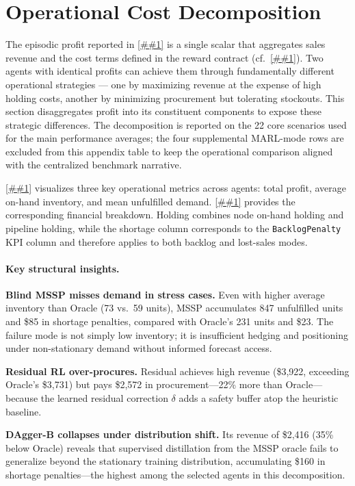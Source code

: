 \documentclass[10pt,a4paper]{article}
\providecommand{\Cref}[1]{\ref{##1}}
\let\origenumerate\enumerate
\let\endorigenumerate\endenumerate
\renewenvironment{enumerate}[1][]{\origenumerate}{\endorigenumerate}
\begin{document}
\section{Operational Cost Decomposition}\label{sec:appendix_decomposition}

The episodic profit reported in \Cref{sec:results} is a single scalar
that aggregates sales revenue and the cost terms defined in the reward
contract (cf.\ \Cref{sec:framework}). Two agents with identical profits
can achieve them through fundamentally different operational strategies
--- one by maximizing revenue at the expense of high holding costs,
another by minimizing procurement but tolerating stockouts.
This section disaggregates profit into its constituent components
to expose these strategic differences. The decomposition is reported
on the 22 core scenarios used for the main performance averages; the
four supplemental MARL-mode rows are excluded from this appendix table
to keep the operational comparison aligned with the centralized
benchmark narrative.

\Cref{fig:reward_decomp} visualizes three key operational metrics
across agents: total profit, average on-hand inventory, and mean
unfulfilled demand. \Cref{tab:cost_decomposition} provides the
corresponding financial breakdown. Holding combines node on-hand
holding and pipeline holding, while the shortage column corresponds to
the \texttt{BacklogPenalty} KPI column and therefore applies to both
backlog and lost-sales modes.

\paragraph{Key structural insights.}
\begin{enumerate}
  \item \textbf{Blind MSSP misses demand in stress cases.} Even with
    higher average inventory than Oracle (73 vs.\ 59 units), MSSP
    accumulates 847 unfulfilled units and \$85 in shortage penalties,
    compared with Oracle's 231 units and \$23. The failure mode is not
    simply low inventory; it is insufficient hedging and positioning
    under non-stationary demand without informed forecast access.
  \item \textbf{Residual RL over-procures.} Residual achieves high
    revenue (\$3{,}922, exceeding Oracle's \$3{,}731) but pays
    \$2{,}572 in procurement---22\% more than Oracle---because the
    learned residual correction $\delta$ adds a safety buffer atop
    the heuristic baseline.
  \item \textbf{DAgger-B collapses under distribution shift.}
    Its revenue of \$2{,}416 (35\% below Oracle) reveals that
    supervised distillation from the MSSP oracle fails to generalize
    beyond the stationary training distribution, accumulating
    \$160 in shortage penalties---the highest among the selected
    agents in this decomposition.
\end{enumerate}
\end{document}
